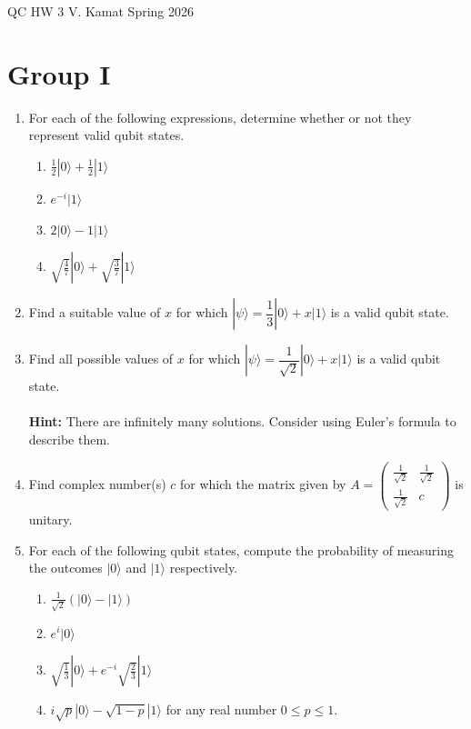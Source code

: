 \documentclass[12pt]{article}
\begin{document}
	
\centerline{QC HW 3
	\hspace{0.4 in}V. Kamat
	\hspace{0.4 in}Spring 2026}

\section*{Group I}

\begin{enumerate}
\item For each of the following expressions, determine whether or not they represent valid qubit states.
\begin{enumerate}
    \item $\frac{1}{2}|0\rangle+\frac{1}{2}|1\rangle$
    \item $e^{-i}|1\rangle$
    \item $2|0\rangle-1|1\rangle$
    \item $\sqrt{\frac{4}{7}}|0\rangle+\sqrt{\frac{3}{7}}|1\rangle$
\end{enumerate}
\item Find a suitable value of $x$ for which $|\psi\rangle = \dfrac{1}{3}|0\rangle+x|1\rangle$ is a valid qubit state. 
\item Find all possible values of $x$ for which $|\psi\rangle = \dfrac{1}{\sqrt{2}}|0\rangle+x|1\rangle$ is a valid qubit state.
\\
\\
\textbf{Hint:} There are infinitely many solutions. Consider using Euler's formula to describe them. 
\item Find complex number(s) $c$ for which the matrix given by 
$
A =
\begin{pmatrix}
\frac{1}{\sqrt{2}} & \frac{1}{\sqrt{2}} \\
\frac{1}{\sqrt{2}} & c
\end{pmatrix}
$ is unitary. 
\item For each of the following qubit states, compute the probability of measuring the outcomes $|0\rangle$ and $|1\rangle$ respectively.
\begin{enumerate}
    \item $\frac{1}{\sqrt{2}}\left(|0\rangle-|1\rangle\right)$
    \item $e^i|0\rangle$
    \item $\sqrt{\frac{1}{3}}|0\rangle+e^{-i}\sqrt{\frac{2}{3}}|1\rangle$
    \item $i \sqrt{p}|0\rangle-\sqrt{1-p}|1\rangle$ for any real number $0\leq p\leq 1$.
\end{enumerate}
\end{enumerate}
\end{document}
